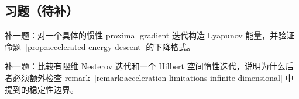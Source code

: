 \subsection*{习题（待补）}

\begin{exercise}
补一题：对一个具体的惯性 proximal gradient 迭代构造 Lyapunov 能量，并验证命题~\ref{prop:accelerated-energy-descent} 的下降格式。
\end{exercise}

\begin{exercise}[加速边界桥接题占位]
补一题：比较有限维 Nesterov 迭代和一个 Hilbert 空间惰性迭代，说明为什么后者必须额外检查 remark~\ref{remark:acceleration-limitations-infinite-dimensional} 中提到的稳定性边界。
\end{exercise}
